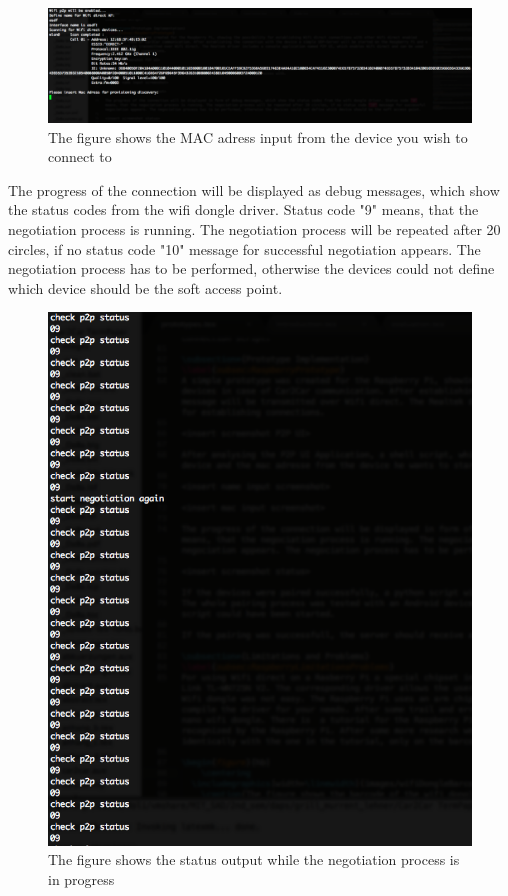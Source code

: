 \begin{figure}[!hb]
	\centering
  \includegraphics[width=\linewidth]{images/enterMac_screenshot.eps}
	\caption{The figure shows the MAC adress input from the device you wish to connect to}
	\label{fig1}
\end{figure}

\noindent The progress of the connection will be displayed as debug messages, which show the status codes from the wifi dongle driver. Status code "9" means, that the negotiation process is running. The negotiation process will be repeated after 20 circles, if no status code "10" message for successful negotiation appears. The negotiation process has to be performed, otherwise the devices could not define which device should be the soft access point.

\begin{figure}[!hb]
	\centering
  \includegraphics[width=\linewidth]{images/status_screenshot.eps}
	\caption{The figure shows the status output while the negotiation process is in progress}
	\label{fig1}
\end{figure}

